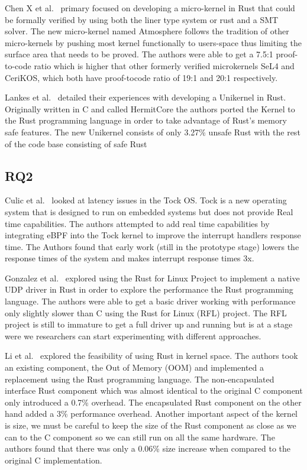 \documentclass[sigconf]{acmart}
\begin{document}
Chen X et al.~\cite{Chen2023-wb} primary focused on developing a micro-kernel in Rust that could be
formally verified by using both the liner type system or rust and a SMT solver. The new micro-kernel
named Atmosphere follows the tradition of other micro-kernels by pushing most kernel functionally to
users-space thus limiting the surface area that needs to be proved. The authors were able to get a
7.5:1 proof-to-code ratio which is higher that other formerly verified microkernels SeL4 and
CeriKOS, which both have proof-tocode ratio of 19:1 and 20:1 respectively.

Lankes et al.~\cite{Lankes2019-cm} detailed their experiences with developing a Unikernel in
Rust. Originally written in C and called HermitCore the authors ported the Kernel to the Rust
programming language in order to take advantage of Rust's memory safe features. The new Unikernel
consists of only 3.27\% unsafe Rust with the rest of the code base consisting of safe Rust

\subsection{RQ2}

Culic et al.~\cite{Culic2022-bk} looked at latency issues in the Tock OS. Tock is a new operating
system that is designed to run on embedded systems but does not provide Real time capabilities. The
authors attempted to add real time capabilities by integrating eBPF into the Tock kernel to improve
the interrupt handlers response time. The Authors found that early work (still in the prototype
stage) lowers the response times of the system and makes interrupt response times 3x.

Gonzalez et al.~\cite{Gonzalez2023-ek} explored using the Rust for Linux Project to implement a
native UDP driver in Rust in order to explore the performance the Rust programming language. The
authors were able to get a basic driver working with performance only slightly slower than C using
the Rust for Linux (RFL) project. The RFL project is still to immature to get a full driver up and
running but is at a stage were we researchers can start experimenting with different
approaches.

Li et al.~\cite{Li2019-ru} explored the feasibility of using Rust in kernel space. The authors took
an existing component, the Out of Memory (OOM) and implemented a replacement using the Rust
programming language. The non-encapsulated interface Rust component which was almost identical to
the original C component only introduced a 0.7\% overhead. The encapsulated Rust component on the
other hand added a 3\% performance overhead. Another important aspect of the kernel is size, we must
be careful to keep the size of the Rust component as close as we can to the C component so we can
still run on all the same hardware. The authors found that there was only a 0.06\% size increase
when compared to the original C implementation.
\end{document}
